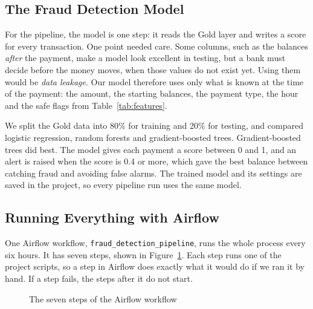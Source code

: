 \documentclass[11pt,a4paper]{article}
\newcommand{\code}[1]{\texttt{#1}}
\begin{document}
\subsection{The Fraud Detection Model}
For the pipeline, the model is one step: it reads the Gold layer and writes a
score for every transaction. One point needed care. Some columns, such as the
balances \emph{after} the payment, make a model look excellent in testing, but a
bank must decide before the money moves, when those values do not exist yet.
Using them would be \emph{data leakage}. Our model therefore uses only what is
known at the time of the payment: the amount, the starting balances, the payment
type, the hour and the safe flags from Table~\ref{tab:features}.

We split the Gold data into 80\% for training and 20\% for testing, and compared
logistic regression, random forests and gradient-boosted trees. Gradient-boosted
trees did best. The model gives each payment a score between 0 and 1, and an
alert is raised when the score is 0.4 or more, which gave the best balance
between catching fraud and avoiding false alarms. The trained model and its
settings are saved in the project, so every pipeline run uses the same model.

\subsection{Running Everything with Airflow}
One Airflow workflow, \code{fraud\_detection\_pipeline}, runs the whole process
every six hours. It has seven steps, shown in Figure~\ref{fig:dag}. Each step
runs one of the project scripts, so a step in Airflow does exactly what it would
do if we ran it by hand. If a step fails, the steps after it do not start.

\begin{figure}[H]
\centering
{}
\caption{The seven steps of the Airflow workflow}
\label{fig:dag}
\end{figure}
\end{document}
